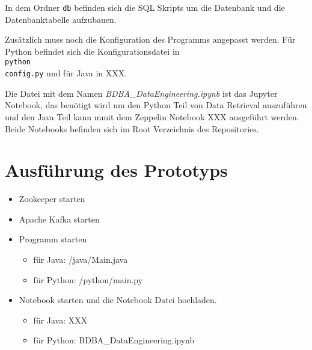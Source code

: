 In dem Ordner \texttt{db} befinden sich die SQL Skripts um die Datenbank und die Datenbanktabelle aufzubauen.

Zusätzlich muss noch die Konfiguration des Programms angepasst werden.
Für Python befindet sich die Konfigurationsdatei in \texttt{\\python\\config.py} und für Java in XXX.

Die Datei mit dem Namen \textit{BDBA\_DataEngineering.ipynb} ist das Jupyter Notebook, das benötigt wird um den Python Teil von Data Retrieval auszuführen
und den Java Teil kann mmit dem Zeppelin Notebook XXX ausgeführt werden.
Beide Notebooks befinden sich im Root Verzeichnis des Repositories.

\section{Ausführung des Prototyps}
\begin{itemize}
  \item Zookeeper starten
  \item Apache Kafka starten
  \item Programm starten
  \begin{itemize}
    \item für Java: /java/Main.java
    \item für Python: /python/main.py
  \end{itemize}
  \item Notebook starten und die Notebook Datei hochladen.
  \begin{itemize}
    \item für Java: XXX
    \item für Python: BDBA\_DataEngineering.ipynb
  \end{itemize}
\end{itemize}
